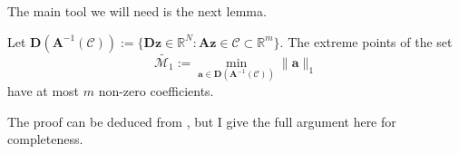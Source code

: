 The main tool we will need is the next lemma.

\begin{lemma}\label{lem:l1_sparse_extreme}
    Let $\mathbf{D}(\mathbf{A}^{-1}(\mathcal{C})) := \{ \mathbf{Dz} \in \mathbb{R}^{N} : \mathbf{Az} \in \mathcal{C} \subset \mathbb{R}^{m} \}$. The extreme points of the set
    \begin{equation}
        \widetilde{\mathcal{M}_1} := \underset{\mathbf{a} \in \mathbf{D}(\mathbf{A}^{-1}(\mathcal{C}))}{\min} \| \mathbf{a} \|_1
    \end{equation}
    have at most $m$ non-zero coefficients.
\end{lemma}

The proof can be deduced from \cite[Theorem 6]{unser2016}, but I give the full argument here for completeness.

